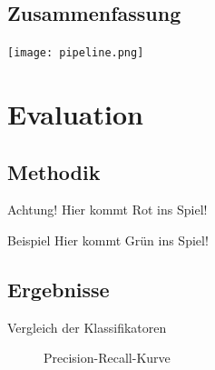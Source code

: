 \documentclass{beamer}
\begin{document}
\subsection{Zusammenfassung}
\begin{frame}
  \begin{center}
    \texttt{[image: pipeline.png]}
  \end{center}
\end{frame}

\section{Evaluation}
\subsection{Methodik}
\begin{frame}
  \begin{alertblock}{Achtung!}
    Hier kommt Rot ins Spiel!
  \end{alertblock}
  \begin{exampleblock}{Beispiel}
    Hier kommt Grün ins Spiel!
  \end{exampleblock}
\end{frame}

\subsection{Ergebnisse}
\begin{frame}
  \begin{table}
  \centering
  \caption{Vergleich der Klassifikatoren}
  \label{tab:prec-recall}
  \end{table}
\end{frame}

\begin{frame}[plain]
\begin{figure}
\caption{Precision-Recall-Kurve}
\label{fig:prec-recall}
\end{figure}
\end{frame}
\end{document}
